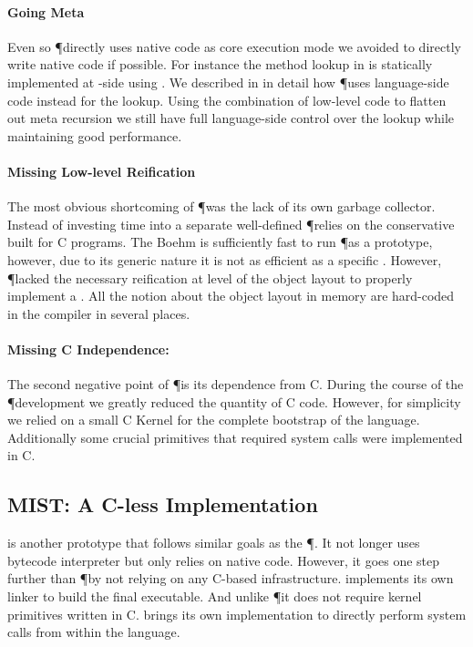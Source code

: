 \paragraph{Going Meta}
Even so \P directly uses native code as core execution mode we avoided to directly write native code if possible.
For instance the method lookup in \Cog is statically implemented at \VM-side using \Slang.
We described in  in detail how \P uses language-side code instead for the lookup.
Using the combination of low-level code to flatten out meta recursion we still have full language-side control over the lookup while maintaining good performance.

\paragraph{Missing Low-level Reification}
The most obvious shortcoming of \P was the lack of its own garbage collector.
Instead of investing time into a separate well-defined \GC \P relies on the conservative  built for C programs.
The Boehm \GC is sufficiently fast to run \P as a prototype, however, due to its generic nature it is not as efficient as a specific \GC.
However, \P lacked the necessary reification at level of the object layout to properly implement a \GC.
All the notion about the object layout in memory are hard-coded in the compiler in several places.

\paragraph{Missing C Independence:}
The second negative point of \P is its dependence from C.
During the course of the \P development we greatly reduced the quantity of C code.
However, for simplicity we relied on a small C Kernel for the complete bootstrap of the language.
Additionally some crucial primitives that required system calls were implemented in C.

\subsection{MIST: A C-less \ST Implementation}
 is another prototype \ST \VM that follows similar goals as the \P \VM.
It not longer uses bytecode interpreter but only relies on native code.
However, it goes one step further than \P by not relying on any C-based infrastructure.
\MIST implements its own linker to build the final executable.
And unlike \P it does not require kernel primitives written in C.
\MIST brings its own implementation to directly perform system calls from within the language.


